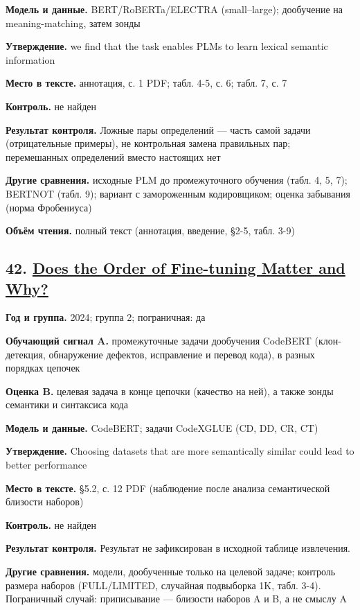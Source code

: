 \textbf{Модель и данные.} BERT/RoBERTa/ELECTRA (small–large); дообучение на meaning-matching, затем зонды

\textbf{Утверждение.} we find that the task enables PLMs to learn lexical semantic information

\textbf{Место в тексте.} аннотация, с. 1 PDF; табл. 4-5, с. 6; табл. 7, с. 7

\textbf{Контроль.} не найден

\textbf{Результат контроля.} Ложные пары определений — часть самой задачи (отрицательные примеры), не контрольная замена правильных пар; перемешанных определений вместо настоящих нет

\textbf{Другие сравнения.} исходные PLM до промежуточного обучения (табл. 4, 5, 7); BERTNOT (табл. 9); вариант с замороженным кодировщиком; оценка забывания (норма Фробениуса)

\textbf{Объём чтения.} полный текст (аннотация, введение, §2-5, табл. 3-9)


\subsection*{42. \href{https://doi.org/10.48550/arxiv.2410.02915}{Does the Order of Fine-tuning Matter and Why?}}

\textbf{Год и группа.} 2024; группа 2; пограничная: да

\textbf{Обучающий сигнал A.} промежуточные задачи дообучения CodeBERT (клон-детекция, обнаружение дефектов, исправление и перевод кода), в разных порядках цепочек

\textbf{Оценка B.} целевая задача в конце цепочки (качество на ней), а также зонды семантики и синтаксиса кода

\textbf{Модель и данные.} CodeBERT; задачи CodeXGLUE (CD, DD, CR, CT)

\textbf{Утверждение.} Choosing datasets that are more semantically similar could lead to better performance

\textbf{Место в тексте.} §5.2, с. 12 PDF (наблюдение после анализа семантической близости наборов)

\textbf{Контроль.} не найден

\textbf{Результат контроля.} Результат не зафиксирован в исходной таблице извлечения.

\textbf{Другие сравнения.} модели, дообученные только на целевой задаче; контроль размера наборов (FULL/LIMITED, случайная подвыборка 1K, табл. 3-4). Пограничный случай: приписывание — близости наборов A и B, а не смыслу A

